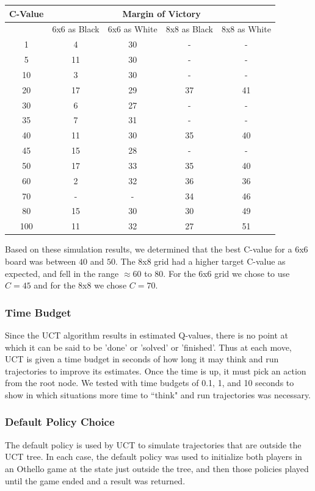 \documentclass[12pt,letterpaper]{article}
\begin{document}
\begin{tabular}{|c|c|c|c|c|}
\hline
C-Value & \multicolumn{4}{c|}{Margin of Victory}\\
\hline 
 & 6x6 as Black & 6x6 as White & 8x8 as Black & 8x8 as White \\ 
\hline 
1 & 4 & 30 & - & - \\ 
\hline 
5 & 11 & 30 & - & - \\ 
\hline 
10 & 3 & 30 & - & - \\ 
\hline 
20 & 17 & 29 & 37 & 41 \\ 
\hline 
30 & 6 & 27 & - & - \\ 
\hline 
35 & 7 & 31 & - & - \\ 
\hline 
40 & 11 & 30 & 35 & 40 \\ 
\hline 
45 & 15 & 28 & - & - \\ 
\hline 
50 & 17 & 33 & 35 & 40 \\ 
\hline 
60 & 2 & 32 & 36 & 36 \\ 
\hline 
70 & - & - & 34 & 46 \\ 
\hline 
80 & 15 & 30 & 30 & 49 \\ 
\hline 
100 & 11 & 32 & 27 & 51 \\ 
\hline 
\end{tabular} 

Based on these simulation results, we determined that the best C-value for a 6x6 board was between $40$ and $50$.  The 8x8 grid had a higher target C-value as expected, and fell in the range $\approx60$ to $80$.  For the 6x6 grid we chose to use $C=45$ and for the 8x8 we chose $C=70$.

\subsubsection{Time Budget}
Since the UCT algorithm results in estimated Q-values, there is no point at which it can be said to be 'done' or 'solved' or 'finished'. Thus at each move, UCT is given a time budget in seconds of how long it may think and run trajectories to improve its estimates. Once the time is up, it must pick an action from the root node. We tested with time budgets of 0.1, 1, and 10 seconds to show in which situations more time to ``think" and run trajectories was necessary.

\subsubsection{Default Policy Choice}
The default policy is used by UCT to simulate trajectories that are outside the UCT tree. In each case, the default policy was used to initialize both players in an Othello game at the state just outside the tree, and then those policies played until the game ended and a result was returned.
\end{document}
